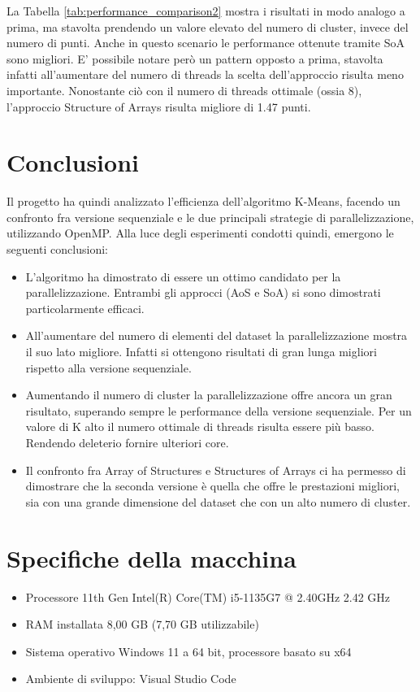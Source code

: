 \documentclass[10pt,twocolumn,letterpaper]{article}
\begin{document}
La Tabella \ref{tab:performance_comparison2} mostra i risultati in modo analogo a prima, ma stavolta prendendo un valore elevato del numero di cluster, invece del numero di punti. Anche in questo scenario le performance ottenute tramite SoA sono migliori. E' possibile notare però un pattern opposto a prima, stavolta infatti all'aumentare del numero di threads la scelta dell'approccio risulta meno importante. Nonostante ciò con il numero di threads ottimale (ossia 8), l'approccio Structure of Arrays risulta migliore di 1.47 punti.









\section{Conclusioni}
Il progetto ha quindi analizzato l’efficienza dell’algoritmo K-Means, facendo un confronto fra
versione sequenziale e le due principali strategie di parallelizzazione, utilizzando OpenMP.
Alla luce degli esperimenti condotti quindi, emergono le
seguenti conclusioni:
\begin{itemize}
   \item L'algoritmo ha dimostrato di essere un ottimo candidato per la parallelizzazione. Entrambi gli approcci (AoS e SoA) si sono dimostrati particolarmente efficaci.
   \item All'aumentare del numero di elementi del dataset la parallelizzazione mostra il suo lato migliore. Infatti si ottengono risultati di gran lunga migliori rispetto alla versione sequenziale.
   \item Aumentando il numero di cluster la parallelizzazione offre ancora un gran risultato, superando sempre le performance della versione sequenziale. Per un valore di K alto il numero ottimale di threads risulta essere più basso. Rendendo deleterio fornire ulteriori core.
   \item Il confronto fra Array of Structures e Structures of Arrays ci ha permesso di dimostrare che la seconda versione è quella che offre le prestazioni migliori, sia con una grande dimensione del dataset che con un alto numero di cluster.
\end{itemize}

\section{Specifiche della macchina}

\begin{itemize}
   \item Processore 11th Gen Intel(R) Core(TM) i5-1135G7 @ 2.40GHz 2.42 GHz
   \item RAM installata 8,00 GB (7,70 GB utilizzabile)
   \item Sistema operativo Windows 11 a 64 bit, processore basato su x64
   \item Ambiente di sviluppo: Visual Studio Code
\end{itemize}
\end{document}
